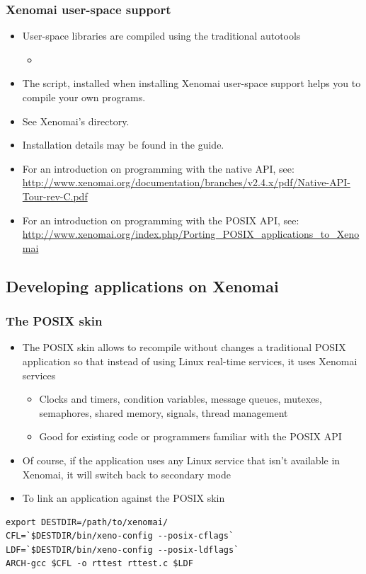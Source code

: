 \begin{frame}
  \frametitle{Xenomai user-space support}
  \begin{itemize}
  \item User-space libraries are compiled using the traditional autotools
    \begin{itemize}
    \item {}
    \end{itemize}
  \item The  script, installed when installing
    Xenomai user-space support helps you to compile your own programs.
  \item See Xenomai's  directory.
  \item Installation details may be found in the 
    guide.
  \item For an introduction on programming with the native API, see:\\
    \url{http://www.xenomai.org/documentation/branches/v2.4.x/pdf/Native-API-Tour-rev-C.pdf}
  \item For an introduction on programming with the POSIX API, see:\\
    \url{http://www.xenomai.org/index.php/Porting_POSIX_applications_to_Xenomai}
  \end{itemize}
\end{frame}

\subsection{Developing applications on Xenomai}

\begin{frame}[fragile]
  \frametitle{The POSIX skin}
  \begin{itemize}
  \item The POSIX skin allows to recompile without changes a
    traditional POSIX application so that instead of using Linux
    real-time services, it uses Xenomai services
    \begin{itemize}
    \item Clocks and timers, condition variables, message queues,
      mutexes, semaphores, shared memory, signals, thread management
    \item Good for existing code or programmers familiar with the
      POSIX API
    \end{itemize}
  \item Of course, if the application uses any Linux service that
    isn't available in Xenomai, it will switch back to secondary mode
  \item To link an application against the POSIX skin
  \end{itemize}
  \begin{block}{}
\small
\begin{verbatim}
export DESTDIR=/path/to/xenomai/
CFL=`$DESTDIR/bin/xeno-config --posix-cflags`
LDF=`$DESTDIR/bin/xeno-config --posix-ldflags`
ARCH-gcc $CFL -o rttest rttest.c $LDF
\end{verbatim}
\normalsize
\end{block}
\end{frame}

